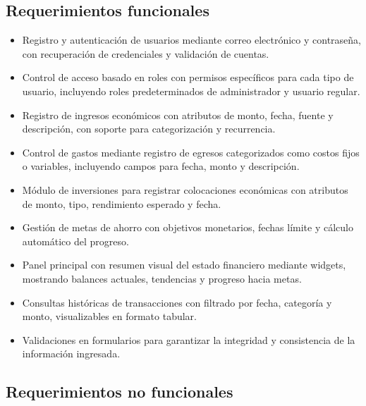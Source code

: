 \documentclass[journal]{IEEEtran}
\begin{document}
\subsection{Requerimientos funcionales}

\begin{itemize}
  \item Registro y autenticación de usuarios mediante correo electrónico y contraseña, con recuperación de credenciales y validación de cuentas.

  \item Control de acceso basado en roles con permisos específicos para cada tipo de usuario, incluyendo roles predeterminados de administrador y usuario regular.

  \item Registro de ingresos económicos con atributos de monto, fecha, fuente y descripción, con soporte para categorización y recurrencia.

  \item Control de gastos mediante registro de egresos categorizados como costos fijos o variables, incluyendo campos para fecha, monto y descripción.

  \item Módulo de inversiones para registrar colocaciones económicas con atributos de monto, tipo, rendimiento esperado y fecha.

  \item Gestión de metas de ahorro con objetivos monetarios, fechas límite y cálculo automático del progreso.

  \item Panel principal con resumen visual del estado financiero mediante widgets, mostrando balances actuales, tendencias y progreso hacia metas.

  \item Consultas históricas de transacciones con filtrado por fecha, categoría y monto, visualizables en formato tabular.

  \item Validaciones en formularios para garantizar la integridad y consistencia de la información ingresada.
\end{itemize}

\subsection{Requerimientos no funcionales}
\end{document}
